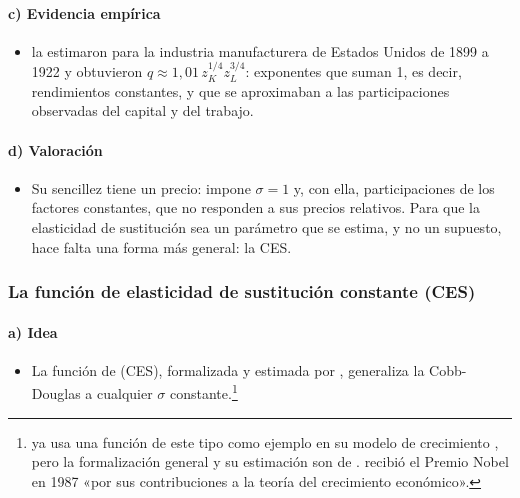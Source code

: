 \documentclass[11pt]{article}
\begin{document}
\paragraph{c) Evidencia empírica}

\begin{itemize}
\item \textcite{CobbDouglas1928Theory} la estimaron para la industria manufacturera de Estados Unidos de 1899 a 1922 y obtuvieron $q\approx 1{,}01\,z_K^{1/4}z_L^{3/4}$: exponentes que suman 1, es decir, rendimientos constantes, y que se aproximaban a las participaciones observadas del capital y del trabajo\nocite{Douglas1976Once}.
\end{itemize}

\paragraph{d) Valoración}

\begin{itemize}
\item Su sencillez tiene un precio: impone $\sigma=1$ y, con ella, participaciones de los factores constantes, que no responden a sus precios relativos. Para que la elasticidad de sustitución sea un parámetro que se estima, y no un supuesto, hace falta una forma más general: la CES.
\end{itemize}

\subsubsection{La función de elasticidad de sustitución constante (CES)}\label{sec:funcion-elasticidad-sustitucion}

\paragraph{a) Idea}

\begin{itemize}
\item La función de  (CES), formalizada y estimada por \textcite{ArrowEtAl1961Capital}, generaliza la Cobb-Douglas a cualquier $\sigma$ constante.\footnote{\textcite{Solow1956Contribution} ya usa una función de este tipo como ejemplo en su modelo de crecimiento , pero la formalización general y su estimación son de \textcite{ArrowEtAl1961Capital}\nocite{KlumpPreissler2000CES}.  recibió el Premio Nobel en 1987 «por sus contribuciones a la teoría del crecimiento económico»\nocite{Nobel1987Solow}.}
\end{itemize}
\end{document}
